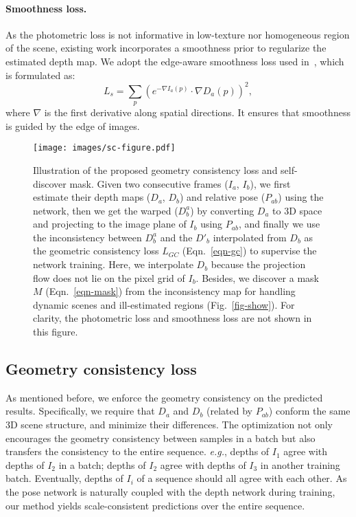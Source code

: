 \documentclass{article}
\newcommand{\figref}[1]{Fig.~\ref{#1}}
\newcommand{\equref}[1]{Eqn.~\ref{#1}}
\def\eg{\emph{e.g.}}
\begin{document}
\paragraph{Smoothness loss.}
As the photometric loss is not informative in low-texture nor homogeneous region of the scene,
existing work incorporates a smoothness prior to regularize the estimated depth map.
We adopt the edge-aware smoothness loss used in~\cite{ranjan2019cc}, which is formulated as:
\begin{equation}
L_{s} = \sum_{p} ( e^{-\nabla I_a(p)} \cdot \nabla D_a(p) ) ^2,
\end{equation}
where $\nabla$ is the first derivative along spatial directions. 
It ensures that smoothness is guided by the edge of images.


\begin{figure}[!t]
\centering
\texttt{[image: images/sc-figure.pdf]}
\caption{Illustration of the proposed geometry consistency loss and self-discover mask.
Given two consecutive frames ($I_a$, $I_b$), we first estimate their depth maps ($D_a$, $D_b$) and relative pose ($P_{ab}$) using the network,
then we get the warped ($D^a_b$) by converting $D_a$ to 3D space and projecting to the image plane of $I_b$ using $P_{ab}$,
and finally we use the inconsistency between $D^a_b$ and the $D'_b$ interpolated from $D_b$ as the geometric consistency loss $L_{GC}$ (\equref{eqn-gc}) to supervise the network training.
Here, we interpolate $D_b$ because the projection flow does not lie on the pixel grid of $I_b$.
Besides, we discover a mask $M$ (\equref{eqn-mask}) from the inconsistency map for handling dynamic scenes and ill-estimated regions (\figref{fig-show}).
For clarity, the photometric loss and smoothness loss are not shown in this figure.
}
\label{fig-sdm}
 \vspace{-2mm}
\end{figure}


\subsection{Geometry consistency loss}\label{sec-gc}

As mentioned before, we enforce the geometry consistency on the predicted results.
Specifically, we require that $D_a$ and $D_b$ (related by $P_{ab}$) conform the same 3D scene structure,
and minimize their differences.
The optimization not
only encourages the geometry consistency between samples in a batch but also transfers the consistency to the entire sequence. 
\eg, depths of $I_1$ agree with depths of $I_2$ in a batch; depths of $I_2$ agree with depths of $I_3$ in another training batch. 
Eventually, depths of $I_i$ of a sequence should all agree with each other.
As the pose network is naturally coupled with the depth network during training, our method yields scale-consistent predictions over the entire sequence.
\end{document}
